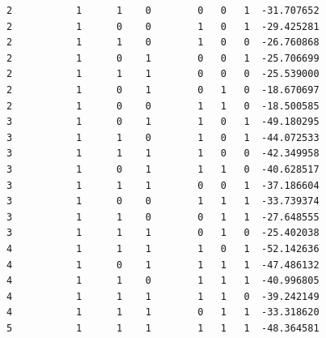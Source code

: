 \documentclass[12pt,a4paper]{article}
\begin{document}
\begin{lstlisting}
2           1      1    0        0   0   1  -31.707652
2           1      0    0        1   0   1  -29.425281
2           1      1    0        1   0   0  -26.760868
2           1      0    1        0   0   1  -25.706699
2           1      1    1        0   0   0  -25.539000
2           1      0    1        0   1   0  -18.670697
2           1      0    0        1   1   0  -18.500585
3           1      0    1        1   0   1  -49.180295
3           1      1    0        1   0   1  -44.072533
3           1      1    1        1   0   0  -42.349958
3           1      0    1        1   1   0  -40.628517
3           1      1    1        0   0   1  -37.186604
3           1      0    0        1   1   1  -33.739374
3           1      1    0        0   1   1  -27.648555
3           1      1    1        0   1   0  -25.402038
4           1      1    1        1   0   1  -52.142636
4           1      0    1        1   1   1  -47.486132
4           1      1    0        1   1   1  -40.996805
4           1      1    1        1   1   0  -39.242149
4           1      1    1        0   1   1  -33.318620
5           1      1    1        1   1   1  -48.364581
\end{lstlisting}
\end{document}

